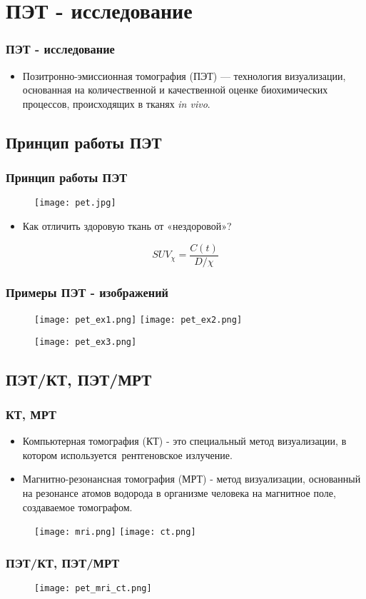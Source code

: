 \section{ПЭТ - исследование}
\begin{frame}
    \frametitle{ПЭТ - исследование}
    \begin{itemize}
        \item Позитронно-эмиссионная томография (ПЭТ) — технология 
        визуализации, основанная на количественной и качественной 
        оценке биохимических процессов, происходящих в тканях \textit{in vivo}.
    \end{itemize}
\end{frame}
\subsection{Принцип работы ПЭТ}
\begin{frame}
    \frametitle{Принцип работы ПЭТ}
    \begin{figure}
        \texttt{[image: pet.jpg]}
    \end{figure}

    \begin{itemize}
        \item Как отличить здоровую ткань от «нездоровой»?
    \end{itemize}
    \[SUV_{\chi}=\frac{C(t)}{D/\chi}\]
\end{frame}


\begin{frame}
    \frametitle{Примеры ПЭТ - изображений}

    \begin{figure}[htbp]
        \texttt{[image: pet\_ex1.png]}
        \hfill
        \texttt{[image: pet\_ex2.png]}   
    \end{figure}

    \begin{figure}
        \texttt{[image: pet\_ex3.png]}
    \end{figure}
\end{frame}

\subsection{ПЭТ/КТ, ПЭТ/МРТ}
\begin{frame}
    \frametitle{КТ, МРТ}
    \begin{itemize}
        \item Компьютерная томография (КТ) - это специальный метод визуализации, в котором используется рентгеновское излучение. 
        \item Магнитно-резонансная томография (МРТ) - метод визуализации, основанный на резонансе атомов водорода в организме человека на магнитное поле, 
        создаваемое томографом.
    \end{itemize}
    \begin{figure}[htbp]
        \texttt{[image: mri.png]}
        \hfill
        \texttt{[image: ct.png]}
    \end{figure}
\end{frame}

\begin{frame}
    \frametitle{ПЭТ/КТ, ПЭТ/МРТ}
    \begin{figure}
        \texttt{[image: pet\_mri\_ct.png]}
    \end{figure}
\end{frame}